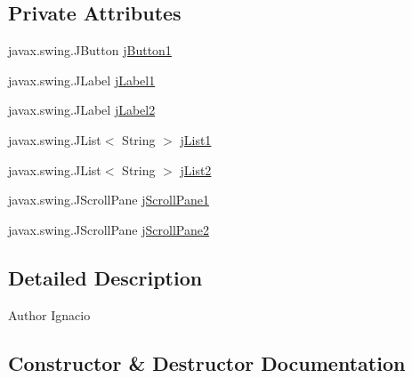 \subsection*{Private Attributes}
\begin{DoxyCompactItemize}
\item 
javax.\+swing.\+J\+Button \mbox{\hyperlink{classinterfacessoguar_1_1verplazas_c_u04_a2711671a6e6008061f70195e1689943e}{j\+Button1}}
\item 
javax.\+swing.\+J\+Label \mbox{\hyperlink{classinterfacessoguar_1_1verplazas_c_u04_afdbe2344e261b706d86ca4f7a224cd0c}{j\+Label1}}
\item 
javax.\+swing.\+J\+Label \mbox{\hyperlink{classinterfacessoguar_1_1verplazas_c_u04_a27d9e05008cd65fbf1961ab5fbff22b0}{j\+Label2}}
\item 
javax.\+swing.\+J\+List$<$ String $>$ \mbox{\hyperlink{classinterfacessoguar_1_1verplazas_c_u04_a6e74d828820b2d45103c85b7fd8e6157}{j\+List1}}
\item 
javax.\+swing.\+J\+List$<$ String $>$ \mbox{\hyperlink{classinterfacessoguar_1_1verplazas_c_u04_a56747d2eed236a05a0369d85176c5ca3}{j\+List2}}
\item 
javax.\+swing.\+J\+Scroll\+Pane \mbox{\hyperlink{classinterfacessoguar_1_1verplazas_c_u04_a5428b3d2cbdfce05a862d256da2577d5}{j\+Scroll\+Pane1}}
\item 
javax.\+swing.\+J\+Scroll\+Pane \mbox{\hyperlink{classinterfacessoguar_1_1verplazas_c_u04_a2c437bac63275cca364bd05ee48332e6}{j\+Scroll\+Pane2}}
\end{DoxyCompactItemize}


\subsection{Detailed Description}
\begin{DoxyAuthor}{Author}
Ignacio 
\end{DoxyAuthor}


\subsection{Constructor \& Destructor Documentation}
\mbox{\label{classinterfacessoguar_1_1verplazas_c_u04_a7c480282265a6a9b53792a7c6733f3f1}} 
